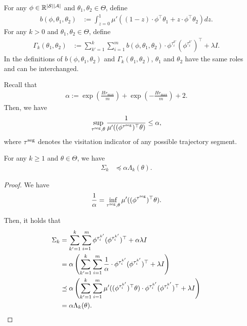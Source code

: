 For any $\phi \in \mathbb{R}^{|\mathcal{S}||\mathcal{A}|}$ and $\theta_1,\theta_2 \in \Theta$, define
\begin{align*}
	b(\phi,\theta_1,\theta_2)&:=\int_{z=0}^{1} \mu'( (1-z) \cdot \phi^\top \theta_1 + z \cdot \phi^\top \theta_2) dz .
\end{align*}
For any $k>0$ and $\theta_1,\theta_2 \in \Theta$, define
\begin{align*}
	\Gamma_k(\theta_1,\theta_2)&:= \sum_{k'=1}^{k} \sum_{i=1}^{m} b(\phi,\theta_1,\theta_2) \cdot \phi^{\tau^{k'}_i} (\phi^{\tau^{k'}_i})^\top + \lambda I .
\end{align*}
In the definitions of $b(\phi,\theta_1,\theta_2)$ and $\Gamma_k(\theta_1,\theta_2)$, $\theta_1$ and $\theta_2$ have the same roles and can be interchanged.

Recall that 
\begin{align*}
	\alpha := \exp(\frac{H r_{\max}}{m})+\exp(-\frac{H r_{\max}}{m})+2 .
\end{align*}
Then, we have
\begin{align*}
	\sup_{\tau^{\textup{seg}}, \theta} \frac{1}{\mu'((\phi^{\tau^{\textup{seg}}})^\top \theta)} \leq \alpha ,
\end{align*}
where $\tau^{\textup{seg}}$ denotes the visitation indicator of any possible trajectory segment.

\begin{lemma} \label{lemma:transform_Lambda_Sigma}
	For any $k\geq 1$ and $\theta \in \Theta$, we have
	\begin{align*}
		\Sigma_k &\preceq \alpha  \Lambda_k(\theta) .
	\end{align*}
\end{lemma}
\begin{proof}
	We have
	\begin{align*}
		\frac{1}{\alpha} = \inf_{\tau^{\textup{seg}}, \theta} \mu'((\phi^{\tau^{\textup{seg}}})^\top \theta) .
	\end{align*}
	
	Then, it holds that
	\begin{align*}
		\Sigma_k &= \sum_{k'=1}^{k} \sum_{i=1}^{m} \phi^{\tau^{k'}_i} (\phi^{\tau^{k'}_i})^\top + \alpha \lambda I
		\\
		&= \alpha  \left(  \sum_{k'=1}^{k} \sum_{i=1}^{m} \frac{1}{\alpha} \cdot \phi^{\tau^{k'}_i} (\phi^{\tau^{k'}_i})^\top +  \lambda I  \right)
		\\
		&\preceq \alpha  \left(  \sum_{k'=1}^{k} \sum_{i=1}^{m} \mu'( (\phi^{\tau^{k'}_i})^\top\theta ) \cdot \phi^{\tau^{k'}_i} (\phi^{\tau^{k'}_i})^\top + \lambda I  \right)
		\\
		&= \alpha  \Lambda_k(\theta) .
	\end{align*}
\end{proof}


